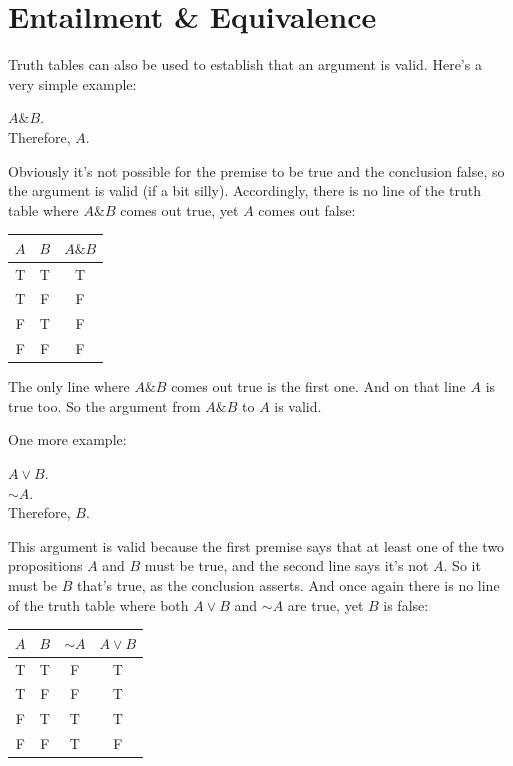 \documentclass[justified]{tufte-book}
\renewcommand{\neg}{\mathbin{\sim}}
\renewcommand{\wedge}{\mathbin{\&}}
\theoremstyle{definition}
\theoremstyle{definition}
\theoremstyle{definition}
\theoremstyle{definition}
\theoremstyle{remark}
\begin{document}
\hypertarget{entailment-equivalence}{%
\section{Entailment \& Equivalence}\label{entailment-equivalence}}

Truth tables can also be used to establish that an argument is valid. Here's a very simple example:

\begin{argument}
\(A \wedge B\).\\
Therefore, \(A\).
\end{argument}

Obviously it's not possible for the premise to be true and the conclusion false, so the argument is valid (if a bit silly). Accordingly, there is no line of the truth table where \(A \wedge B\) comes out true, yet \(A\) comes out false:

\begin{longtable}[]{@{}ccc@{}}
\toprule
\(A\) & \(B\) & \(A \wedge B\) \\
\midrule
\endhead
T & T & T \\
T & F & F \\
F & T & F \\
F & F & F \\
\bottomrule
\end{longtable}

The only line where \(A \wedge B\) comes out true is the first one. And on that line \(A\) is true too. So the argument from \(A \wedge B\) to \(A\) is valid.

One more example:

\begin{argument}
\(A \vee B\).\\
\(\neg A\).\\
Therefore, \(B\).
\end{argument}

This argument is valid because the first premise says that at least one of the two propositions \(A\) and \(B\) must be true, and the second line says it's not \(A\). So it must be \(B\) that's true, as the conclusion asserts. And once again there is no line of the truth table where both \(A \vee B\) and \(\neg A\) are true, yet \(B\) is false:

\begin{longtable}[]{@{}cccc@{}}
\toprule
\(A\) & \(B\) & \(\neg A\) & \(A \vee B\) \\
\midrule
\endhead
T & T & F & T \\
T & F & F & T \\
F & T & T & T \\
F & F & T & F \\
\bottomrule
\end{longtable}
\end{document}
